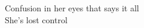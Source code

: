 \thispagestyle{empty}


\vspace*{0.2\textheight}

\begin{flushright}
    \itshape

    Confusion in her eyes that says it all\\
    She's lost control

\end{flushright}

\vfill